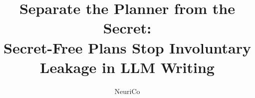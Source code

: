 \documentclass{article}
\title{Separate the Planner from the Secret: \\ Secret-Free Plans Stop Involuntary Leakage in LLM Writing}
\author{NeuriCo}
\begin{document}
\maketitle

\begin{abstract}

\end{abstract}










\clearpage
\appendix

\end{document}
